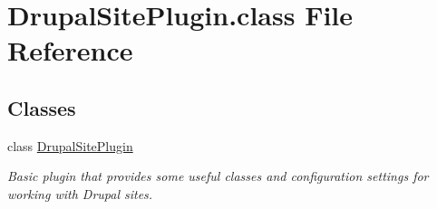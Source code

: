 \hypertarget{DrupalSitePlugin_8class}{\section{Drupal\-Site\-Plugin.\-class File Reference}
\label{DrupalSitePlugin_8class}
}
\subsection*{Classes}
\begin{DoxyCompactItemize}
\item 
class \hyperlink{classDrupalSitePlugin}{Drupal\-Site\-Plugin}
\begin{DoxyCompactList}\small\item\em Basic plugin that provides some useful classes and configuration settings for working with Drupal sites. \end{DoxyCompactList}\end{DoxyCompactItemize}
